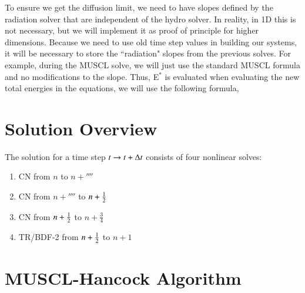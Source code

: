 \documentclass[preprint,12pt]{elsarticle}
\begin{document}
To ensure we get the diffusion limit, we need to have slopes defined by the radiation
solver that are independent of the hydro solver.  In reality, in 1D this is not
necessary, but we will implement it as proof of principle for higher dimensions. Because we need to use
old time step values in building our systems, it will be necessary to store the
``radiation" slopes from the previous solves. For example, during the MUSCL solve, we
will just use the standard MUSCL formula and no modifications to the slope. Thus,
E$^*$ is evaluated when evaluating the new
total energies in the equations, we will use the following formula,

\section{Solution Overview}
The solution for a time step $t\rightarrow t+\Delta t$ consists of four nonlinear
solves:

\begin{enumerate}
  \item CN from $n$ to $n+\fourth$
  \item CN from $n+\fourth$ to $n+\frac{1}{2}$
  \item CN from $n+\frac{1}{2}$ to $n+\frac{3}{4}$
  \item TR/BDF-2 from $n+\frac{1}{2}$ to $n+1$
\end{enumerate}

\section{MUSCL-Hancock Algorithm}
\end{document}
